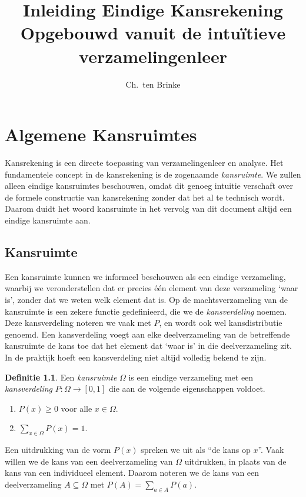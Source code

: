 \documentclass[a4paper]{book}
\title{Inleiding Eindige Kansrekening \\ \small{Opgebouwd vanuit de intu\"itieve verzamelingenleer}}
\author{Ch.\ ten Brinke}
\theoremstyle{definition}
\newtheorem{definition}[theorem]{Definitie}
\begin{document}
\maketitle

\chapter{Algemene Kansruimtes}
Kansrekening is een directe toepassing van verzamelingenleer en analyse.
Het fundamentele concept in de kansrekening is de zogenaamde \emph{kansruimte}.
We zullen alleen eindige kansruimtes beschouwen, omdat dit genoeg intuitie verschaft over de formele constructie van kansrekening zonder dat het al te
technisch wordt.
Daarom duidt het woord kansruimte in het vervolg van dit document altijd een eindige kansruimte aan.



\section{Kansruimte}
Een kansruimte kunnen we informeel beschouwen als een eindige verzameling, waarbij we veronderstellen dat er precies \'e\'en element van deze verzameling `waar is', zonder dat we weten welk element dat is.
Op de machtsverzameling van de kansruimte is een zekere functie gedefinieerd, die we de \emph{kansverdeling} noemen.
Deze kansverdeling noteren we vaak met $P$, en wordt ook wel kansdistributie genoemd.
Een kansverdeling voegt aan elke deelverzameling van de betreffende kansruimte de kans toe dat het element dat `waar is' in die deelverzameling zit.
In de praktijk hoeft een kansverdeling niet altijd volledig bekend te zijn.

\begin{definition}
    Een \emph{kansruimte} $\Omega$ is een eindige verzameling met een \emph{kansverdeling} $P: \Omega \to [0,1]$  die aan de volgende eigenschappen voldoet.
    \begin{enumerate}[i]
        \item $P(x) \geq 0$ voor alle $x \in \Omega$.
        \item $\sum_{x \in \Omega}P(x) = 1$.
    \end{enumerate}

    Een uitdrukking van de vorm $P(x)$ spreken we uit als ``de kans op $x$''.
    Vaak willen we de kans van een deelverzameling van $\Omega$ uitdrukken, in plaats van de kans van een individueel element.
    Daarom noteren we de kans van een deelverzameling $A \subseteq \Omega$ met $P(A) = \sum_{a \in A} P(a)$.
\end{definition}
\end{document}

